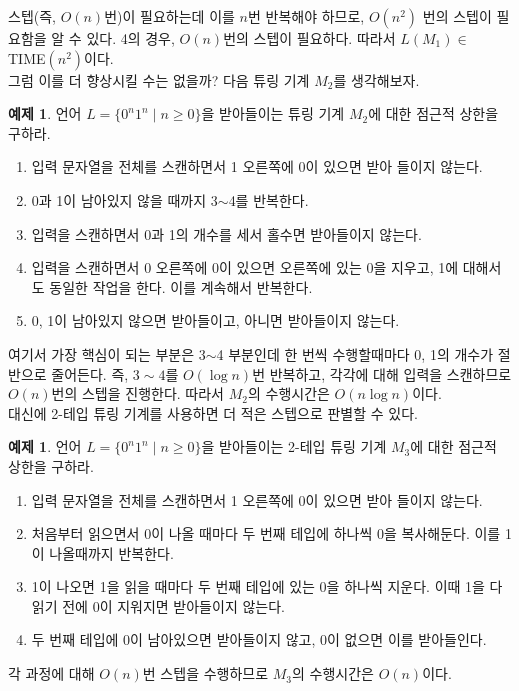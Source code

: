 \documentclass[b5paper, 11pt]{book}
\theoremstyle{definition}
\newtheorem{ex}[defn]{예제}
\begin{document}
스텝(즉, $O(n)$번)이 필요하는데 이를 $n$번 반복해야 하므로, $O(n^2)$ 번의 스텝이 필요함을 알 수 있다. 
4의 경우, $O(n)$번의 스텝이 필요하다. 따라서 $L(M_1) \in$ TIME$(n^2)$이다. \\ 
그럼 이를 더 향상시킬 수는 없을까? 다음 튜링 기계 $M_2$를 생각해보자. 
\begin{ex} \label{nlogn regular}
    언어 $L = \{0^n1^n \;\vert\; n \ge 0\}$을 받아들이는 튜링 기계 $M_2$에 대한 점근적 상한을 구하라. 
    \begin{enumerate}
        \item 입력 문자열을 전체를 스캔하면서 1 오른쪽에 0이 있으면 받아 들이지 않는다. 
        \item 0과 1이 남아있지 않을 때까지 3$\sim$4를 반복한다.
        \item 입력을 스캔하면서 0과 1의 개수를 세서 홀수면 받아들이지 않는다.
        \item 입력을 스캔하면서 0 오른쪽에 0이 있으면 오른쪽에 있는 0을 지우고, 1에 대해서도 동일한
        작업을 한다. 이를 계속해서 반복한다.
        \item 0, 1이 남아있지 않으면 받아들이고, 아니면 받아들이지 않는다.
    \end{enumerate}
\end{ex}
여기서 가장 핵심이 되는 부분은 3$\sim$4 부분인데 한 번씩 수행할때마다 0, 1의 개수가 절반으로 줄어든다.
즉, $3\sim 4$를 $O(\log{n})$번 반복하고, 각각에 대해 입력을 스캔하므로 $O(n)$번의 스텝을 진행한다. 
따라서 $M_2$의 수행시간은 $O(n\log{n})$이다. \\ 
대신에 2-테입 튜링 기계를 사용하면 더 적은 스텝으로 판별할 수 있다. 
\begin{ex}
    언어 $L= \{0^n1^n \;\vert\; n \ge 0\}$을 받아들이는 2-테입 튜링 기계 $M_3$에
     대한 점근적 상한을 구하라.
    \begin{enumerate}
        \item 입력 문자열을 전체를 스캔하면서 1 오른쪽에 0이 있으면 받아 들이지 않는다. 
        \item 처음부터 읽으면서 0이 나올 때마다 두 번째 테입에 하나씩 0을 복사해둔다.
        이를 1이 나올때까지 반복한다. 
        \item 1이 나오면 1을 읽을 때마다 두 번째 테입에 있는 0을 하나씩 지운다.
        이때 1을 다 읽기 전에 0이 지워지면 받아들이지 않는다.
        \item 두 번째 테입에 0이 남아있으면 받아들이지 않고, 0이 없으면 이를 받아들인다. 
    \end{enumerate}
\end{ex}
각 과정에 대해 $O(n)$번 스텝을 수행하므로 $M_3$의 수행시간은 $O(n)$이다. \\ 
\end{document}
